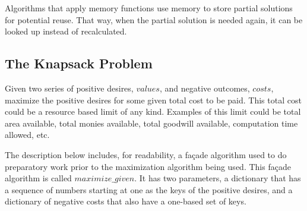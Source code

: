 \documentclass[a4paper,10pt]{book}
\begin{document}
Algorithms that apply memory functions use memory to store partial solutions for potential reuse. That way, when the partial solution is needed again, it can be looked up instead of recalculated.

\subsection{The Knapsack Problem}
Given two series of positive desires, $values$, and negative outcomes, $costs$, maximize the positive desires for some given total cost to be paid. This total cost could be a resource based limit of any kind. Examples of this limit could be total area available, total monies available, total goodwill available, computation time allowed, etc.

The description below includes, for readability, a fa\c cade algorithm used to do preparatory work prior to the maximization algorithm being used. This fa\c cade algorithm is called $maximize\_given$. It has two parameters, a dictionary that has a sequence of numbers starting at one as the keys of the positive desires, and a dictionary of negative costs that also have a one-based set of keys.
\end{document}

